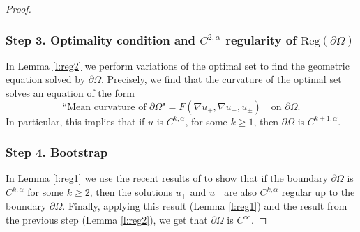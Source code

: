 \documentclass[11pt]{article}
\numberwithin{equation}{section}
\newcommand{\Reg}{\mathrm{Reg}}
\theoremstyle{plain}
\theoremstyle{definition}
\begin{document}
\begin{proof}
\subsubsection*{Step 3. Optimality condition and $C^{2,\alpha}$ regularity of $ \Reg(\partial\Omega)$} In Lemma \ref{l:reg2} we perform variations of the optimal set to find the geometric equation solved by $\partial\Omega$. Precisely, we find that the curvature of the optimal set solves an equation of the form
\[\text{``Mean curvature of $\partial\Omega$"}=F(\nabla u_+,\nabla u_-,u_\pm)\quad\text{on } \partial\Omega.\]
In particular, this implies that if $u$ is $C^{k,\alpha}$, for some $k\ge 1$, then $\partial\Omega$ is $C^{k+1,\alpha}$.

\subsubsection*{Step 4. Bootstrap} In Lemma \ref{l:reg1} we use the recent results of \cite{D} to show that if the boundary $\partial\Omega$ is $C^{k,\alpha}$ for some $k\ge 2$, then the solutions $u_+$ and $u_-$ are also $C^{k,\alpha}$ regular up to the boundary $\partial\Omega$. Finally, applying this result (Lemma \ref{l:reg1}) and the result from the previous step (Lemma \ref{l:reg2}), we get that $\partial\Omega$ is $C^\infty$.
\end{proof}
\end{document}
